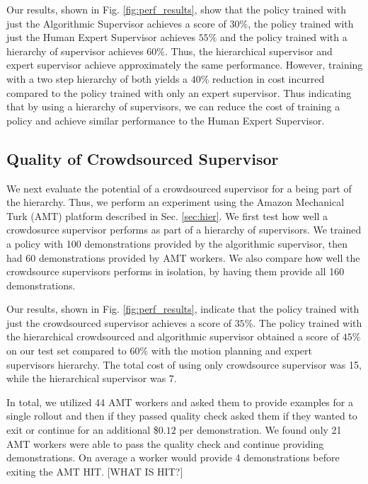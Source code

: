 \documentclass[10pt, conference]{ieeeconf}      %
\begin{document}
Our results, shown in Fig. \ref{fig:perf_results}, show that the policy trained with just the Algorithmic Supervisor
achieves a score of $30\%$, the policy trained with just the Human Expert Supervisor achieves $55\%$ and the policy
trained with a hierarchy of supervisor achieves $60\%$.  Thus, the hierarchical supervisor and expert supervisor achieve
approximately the same performance. However, training with a two step hierarchy of both yields a $40\%$ reduction in
cost incurred compared to the policy trained with only an expert supervisor. Thus indicating that by using a hierarchy of supervisors, we can reduce the cost of training a policy and achieve similar performance to the Human Expert Supervisor.

\subsection{Quality of Crowdsourced Supervisor}
We next evaluate the potential of a  crowdsourced supervisor for a being part of the hierarchy. Thus, we perform an
experiment using the Amazon Mechanical Turk (AMT) platform described in Sec. \ref{sec:hier}. We  first test how well a crowdosurce supervisor
performs as part of a hierarchy of supervisors. We trained a policy with 100  demonstrations provided by the algorithmic
supervisor, then had 60 demonstrations provided by AMT workers. We also compare how well the crowdsource supervisors
performs in isolation, by having them provide all 160 demonstrations.

Our results, shown in Fig. \ref{fig:perf_results}, indicate that the policy trained with just the crowdsourced supervisor achieves
a score of $35\%$. The policy trained with the hierarchical crowdsourced and algorithmic supervisor obtained a score of
$45\%$ on our test set compared to $60\%$ with the motion planning and expert supervisors hierarchy. The total cost of
using only crowdsource supervisor was 15, while the hierarchical supervisor was 7. 

In total, we utilized 44 AMT workers and asked them to provide examples for a single rollout and then if they passed
quality check asked them if they wanted to exit or continue for an additional \$$0.12$ per demonstration. We found only
21 AMT workers were able to pass the quality check and continue providing demonstrations. On average a worker would
provide 4 demonstrations before exiting the AMT HIT. {\color{blue} [WHAT IS HIT?]}
\end{document}

